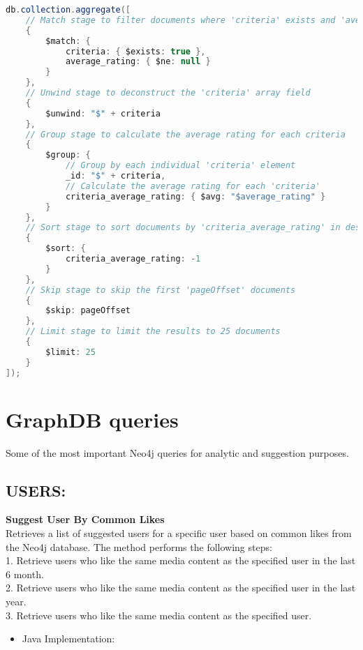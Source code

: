 \begin{mdframed}[style=customstyle]
\begin{lstlisting}[language=java]
db.collection.aggregate([
    // Match stage to filter documents where 'criteria' exists and 'average_rating' is not null
    {
        $match: {
            criteria: { $exists: true },
            average_rating: { $ne: null }
        }
    },
    // Unwind stage to deconstruct the 'criteria' array field
    {
        $unwind: "$" + criteria
    },
    // Group stage to calculate the average rating for each criteria
    {
        $group: {
            // Group by each individual 'criteria' element
            _id: "$" + criteria,
            // Calculate the average rating for each 'criteria'
            criteria_average_rating: { $avg: "$average_rating" }
        }
    },
    // Sort stage to sort documents by 'criteria_average_rating' in descending order
    {
        $sort: {
            criteria_average_rating: -1
        }
    },
    // Skip stage to skip the first 'pageOffset' documents
    {
        $skip: pageOffset
    },
    // Limit stage to limit the results to 25 documents
    {
        $limit: 25
    }
]);
\end{lstlisting}
\end{mdframed}

\newpage
  
\section{GraphDB queries}
Some of the most important Neo4j queries for analytic and suggestion purposes.
\subsection*{USERS:}
\textbf{Suggest User By Common Likes}\\
Retrieves a list of suggested users for a specific user based on common likes from the Neo4j database.
The method performs the following steps:\\
1. Retrieve users who like the same media content as the specified user in the last 6 month.\\
2. Retrieve users who like the same media content as the specified user in the last year.\\
3. Retrieve users who like the same media content as the specified user.\\
\begin{itemize}
    \item Java Implementation:
\end{itemize}

